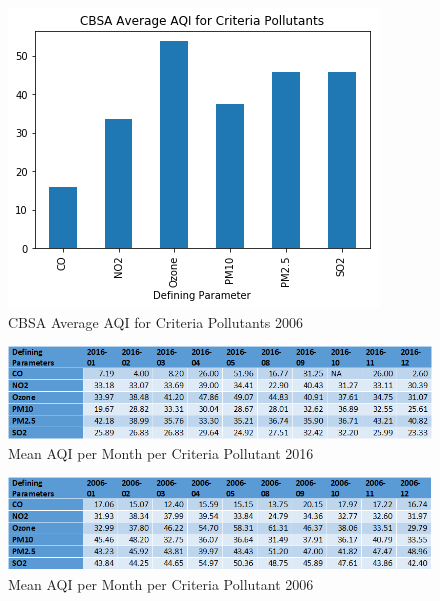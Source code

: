\documentclass[sigconf]{acmart}
\begin{document}
\begin{figure}[htb]
\includegraphics[width=1.0\columnwidth]{images/averageaqi2006.png}
  \caption{CBSA Average AQI for Criteria Pollutants 2006}
  \label{Average CBSA AQI 2006}
\end{figure}

\begin{figure}[htb]
\includegraphics[width=1.0\columnwidth]{images/avaqibymonth2016.png}
  \caption{ Mean AQI per Month per Criteria Pollutant 2016}
  \label{Mean AQI per Month 2016}
\end{figure}


\begin{figure}[htb]
\includegraphics[width=1.0\columnwidth]{images/avaqibymonth2006.png}
  \caption{ Mean AQI per Month per Criteria Pollutant 2006}
  \label{Mean AQI per Month 2006}
\end{figure}
\end{document}
